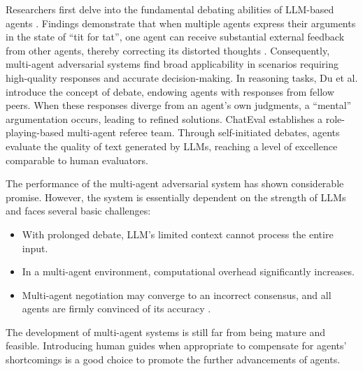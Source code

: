 Researchers first delve into the fundamental debating abilities of LLM-based agents \cite{DBLP:journals/corr/abs-2305-10142,DBLP:journals/corr/abs-2305-11595}. Findings demonstrate that when multiple agents express their arguments in the state of  ``tit for tat'', one agent can receive substantial external feedback from other agents, thereby correcting its distorted thoughts \cite{DBLP:journals/corr/abs-2305-19118}. Consequently, multi-agent adversarial systems find broad applicability in scenarios requiring high-quality responses and accurate decision-making. In reasoning tasks, Du et al. \cite{DBLP:journals/corr/abs-2305-14325} introduce the concept of debate, endowing agents with responses from fellow peers. When these responses diverge from an agent's own judgments, a ``mental'' argumentation occurs, leading to refined solutions. ChatEval \cite{DBLP:journals/corr/abs-2308-07201} establishes a role-playing-based multi-agent referee team. Through self-initiated debates, agents evaluate the quality of text generated by LLMs, reaching a level of excellence comparable to human evaluators.

The performance of the multi-agent adversarial system has shown considerable promise. However, the system is essentially dependent on the strength of LLMs and faces several basic challenges:

\begin{itemize}[leftmargin=*]
    \item With prolonged debate, LLM's limited context cannot process the entire input. 
    \item In a multi-agent environment, computational overhead significantly increases. 
    \item Multi-agent negotiation may converge to an incorrect consensus, and all agents are firmly convinced of its accuracy \cite{DBLP:journals/corr/abs-2305-14325}. 
\end{itemize}

The development of multi-agent systems is still far from being mature and feasible. Introducing human guides when appropriate to compensate for agents' shortcomings is a good choice to promote the further advancements of agents.

